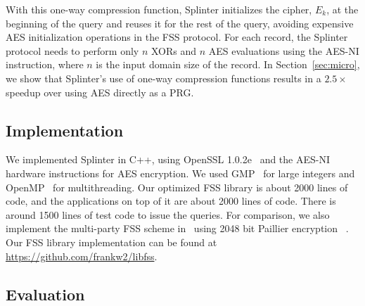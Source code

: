With this one-way compression function, Splinter initializes the cipher, $E_k$,
at the beginning of the query and reuses it
for the rest of the query, avoiding
expensive AES initialization operations in the FSS protocol. 
For each record, the Splinter protocol 
needs to perform only $n$ XORs and $n$ AES
evaluations using the AES-NI instruction, where
$n$ is the input domain size of the record. 
In Section~\ref{sec:micro}, we show that Splinter's use of one-way compression functions
results in a 
$2.5\times$ speedup over using AES directly as a PRG.

\subsection{Implementation}
\label{sec:implementation}

We implemented Splinter in C++, using OpenSSL 1.0.2e~\cite{openssl} 
and the AES-NI hardware instructions
for AES encryption. We used 
GMP~\cite{gmp} for large integers and OpenMP~\cite{openmp} for multithreading.
Our optimized FSS library is about 2000 lines of code, and the applications on top of it are about 2000 lines of code. There is around 
1500 lines of test code to issue the queries. For comparison, 
we also implement the multi-party
FSS scheme in~\cite{corrigan-gibbs:riposte} using 2048 bit Paillier encryption ~\cite{paillier}.
Our FSS library implementation can be found at \url{https://github.com/frankw2/libfss}.

\subsection{Evaluation}
\label{sec:evaluation}

